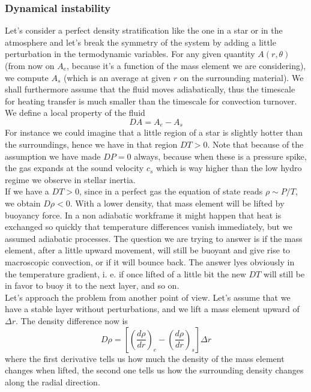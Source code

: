 \documentclass[11pt]{article}
\numberwithin{equation}{section}
\begin{document}
\subsubsection{Dynamical instability}
Let's consider a perfect density stratification like the one in a star or in the atmosphere and let's break the symmetry of the system by adding a little perturbation in the termodynamic variables. For any given quantity $A(r, \theta)$ (from now on $A_e$, because it's a function of the mass element we are considering), we compute $A_s$ (which is an average at given $r$ on the surrounding material). We shall furthermore assume that the fluid moves adiabatically, thus the timescale for heating transfer is much smaller than the timescale for convection turnover. \\
We define a local property of the fluid 
$$
DA=A_e - A_s
$$
For instance we could imagine that a little region of a star is slightly hotter than the surroundings, hence we have in that region $DT > 0$. Note that because of the assumption we have made $DP=0$ always, because when these is a pressure spike, the gas expands at the sound velocity $c_s$ which is way higher than the low hydro regime we observe in stellar inertia.\\
If we have a $DT>0$, since in a perfect gas the equation of state reads $\rho \sim P/T$, we obtain $D \rho < 0$. With a lower density, that mass element will be lifted by buoyancy force. In a non adiabatic workframe it might happen that heat is exchanged so quickly that temperature differences vanish immediately, but we assumed adiabatic processes. The question we are trying to answer is if the mass element, after a little upward movement, will still be buoyant and give rise to macroscopic convection, or if it will bounce back. The answer lyes obviously in the temperature gradient, i. e. if once lifted of a little bit the new $DT$ will still be in favor to buoy it to the next layer, and so on. \\
Let's approach the problem from another point of view. Let's assume that we have a stable layer without perturbations, and we lift a mass element upward of $\Delta r$. The density difference now is
\begin{equation}\label{displacment}
D \rho = \left [  \left( \frac{d \rho}{d r} \right)_e - \left( \frac{d \rho}{d r} \right)_s   \right ] \Delta r
\end{equation}
where the first derivative tells us how much the density of the mass element changes when lifted, the second one tells us how the surrounding density changes along the radial direction. \\
\end{document}
